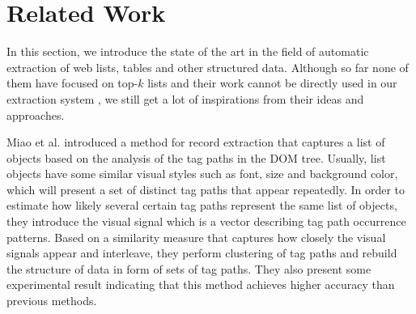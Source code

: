 \section{Related Work}
\label{sec:related}

In this section, we introduce
the state of the art in the field of automatic extraction
of web lists, tables and other structured data.
Although so far none of them have focused on
top-$k$ lists
and their work cannot be directly used in our
extraction system
, we still get a lot of inspirations from their ideas
and approaches.


Miao et al. \cite{MiaoTHSM09:TagPathClustering} introduced a
method for record extraction that captures a list of objects based on
the analysis of the tag paths in the DOM tree.  Usually,
list objects have some similar visual styles such as font, size and
background color, which will present a set of distinct tag paths that
appear repeatedly.  In order to estimate how likely several certain
tag paths represent the same list of objects, they introduce the
visual signal which is a vector describing tag path occurrence
patterns. Based on a similarity measure that captures how closely the
visual signals appear and interleave, they perform clustering of tag
paths and rebuild the structure of data in form of sets of tag paths.
They also present some experimental result indicating that this method
achieves higher accuracy than previous methods.




